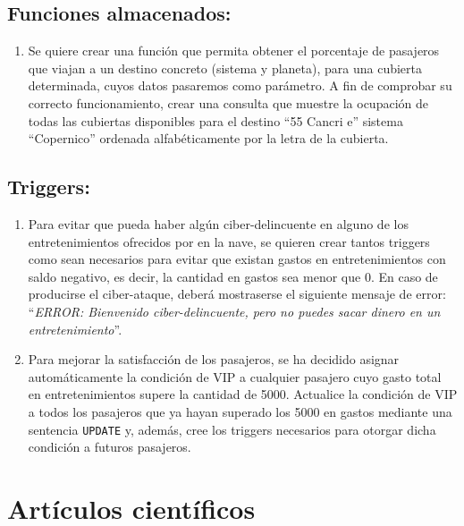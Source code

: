 \documentclass{db-practice}
\begin{document}
\subsection*{Funciones almacenados:}

\begin{enumerate}
    \item Se quiere crear una función que permita obtener el porcentaje de pasajeros que viajan a un destino concreto (sistema y planeta), para una cubierta determinada, cuyos datos pasaremos como parámetro. A fin de comprobar su correcto funcionamiento, crear una consulta que muestre la ocupación de todas las cubiertas disponibles para el destino ``55 Cancri e'' sistema ``Copernico'' ordenada alfabéticamente por la letra de la cubierta.
\end{enumerate}

\subsection*{Triggers:}

\begin{enumerate}
    \item Para evitar que pueda haber algún ciber-delincuente en alguno de los entretenimientos ofrecidos por en la nave, se quieren crear tantos triggers como sean necesarios para evitar que existan gastos en entretenimientos con saldo negativo, es decir, la cantidad en gastos sea menor que 0. En caso de producirse el ciber-ataque, deberá mostraserse el siguiente mensaje de error: ``\textit{ERROR: Bienvenido ciber-delincuente, pero no puedes sacar dinero en un entretenimiento}''.

    \item Para mejorar la satisfacción de los pasajeros, se ha decidido asignar automáticamente la condición de VIP a cualquier pasajero cuyo gasto total en entretenimientos supere la cantidad de 5000. Actualice la condición de VIP a todos los pasajeros que ya hayan superado los 5000 en gastos mediante una sentencia \texttt{UPDATE} y, además, cree los triggers necesarios para otorgar dicha condición a futuros pasajeros.
\end{enumerate}

\section{Artículos científicos}
\end{document}
